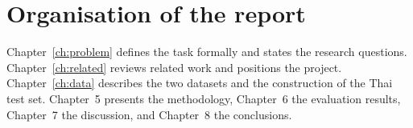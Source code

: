 \section{Organisation of the report}
Chapter~\ref{ch:problem} defines the task formally and states the research questions.
Chapter~\ref{ch:related} reviews related work and positions the project. Chapter~\ref{ch:data}
describes the two datasets and the construction of the Thai test set.
Chapter~5 presents the methodology, Chapter~6 the evaluation results, Chapter~7 the
discussion, and Chapter~8 the conclusions.
